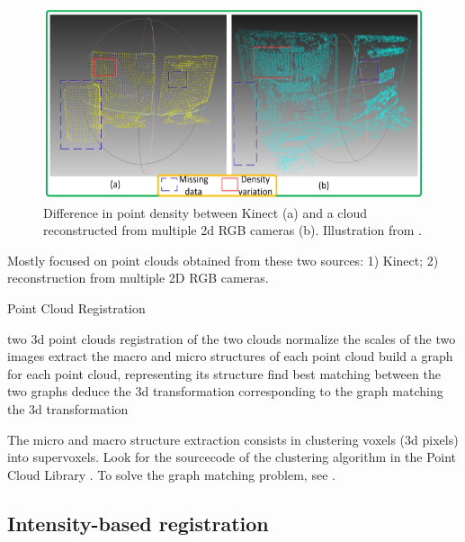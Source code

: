 \documentclass[11pt]{article} %
\begin{document}
\begin{figure}
  \centering
  \includegraphics[width= \linewidth]{kinect.png}
  \caption{Difference in point density between Kinect (a) and a cloud reconstructed from multiple 2d RGB cameras (b). Illustration from \cite{huang:kinect}.}
  \label{fig:kinect}
\end{figure}

Mostly focused on point clouds obtained from these two sources: 1) Kinect; 2) reconstruction from multiple 2D RGB cameras.
\begin{algorithm}
\caption{Point Cloud Registration \cite{huang:kinect}}
\label{algo:kinect}
\begin{algorithmic}
  \REQUIRE two 3d point clouds
  \ENSURE registration of the two clouds
  \STATE normalize the scales of the two images
  \STATE extract the macro and micro structures of each point cloud
  \STATE build a graph for each point cloud, representing its structure
  \STATE find best matching between the two graphs
  \STATE deduce the 3d transformation corresponding to the graph matching
  \RETURN the 3d transformation
\end{algorithmic}
\end{algorithm}

The micro and macro structure extraction consists in clustering voxels (3d pixels) into supervoxels. Look for the sourcecode of the clustering algorithm in the Point Cloud Library \cite{rusu:pclib}.
To solve the graph matching problem, see \cite{zhou:graphmatching, cour:graphmatching, zaslavskiy:graphmatching, frank:quadratic, gertz:ooqp}.


  \subsection{Intensity-based registration}
\end{document}
